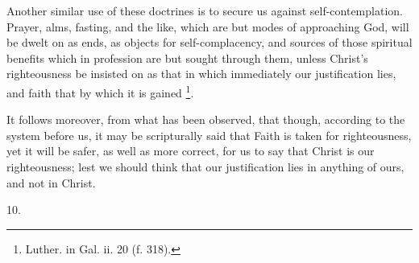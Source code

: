 Another similar use of these doctrines is to secure us against
self-contemplation. Prayer, alms, fasting, and the like, which are but
modes of approaching God, will be dwelt on as ends, as objects for
self-complacency, and sources of those spiritual benefits which in
profession are but sought through them, unless Christ's righteousness
be insisted on as that in which immediately our justification lies,
and faith that by which it is gained \footnote{Luther. in
Gal. ii. 20 (f. 318).}.

It follows moreover, from what has been observed, that though,
according to the system before us, it may be scripturally said that
Faith is taken for righteousness, yet it will be safer, as well as
more correct, for us to say that Christ is our righteousness; lest we
should think that our justification lies in anything of ours, and not
in Christ.

10.

